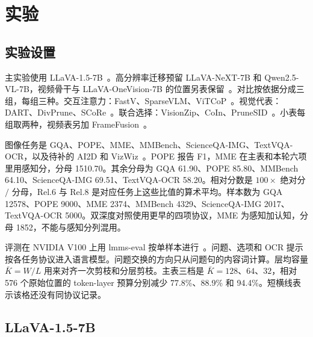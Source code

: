 \section{实验}
\label{sec:experiments}

\subsection{实验设置}
\label{sec:setup}

主实验使用 LLaVA-1.5-7B~\cite{llava15}。高分辨率迁移预留 LLaVA-NeXT-7B 和 Qwen2.5-VL-7B，视频骨干与 LLaVA-OneVision-7B 的位置另表保留~\cite{llavanext,qwen25vl,onevision}。对比按依据分成三组，每组三种。交互注意力：FastV、SparseVLM、ViTCoP~\cite{fastv,sparsevlm,vitcop}。视觉代表：DART、DivPrune、SCoRe~\cite{dart,divprune,score}。联合选择：VisionZip、CoIn、PruneSID~\cite{visionzip,coin,prunesid}。小表每组取两种，视频表另加 FrameFusion~\cite{framefusion}。

图像任务是 GQA、POPE、MME、MMBench、ScienceQA-IMG、TextVQA-OCR，以及待补的 AI2D 和 VizWiz~\cite{gqa,pope,mme,mmbench,scienceqa,textvqa,ai2d,vizwiz}。POPE 报告 F1，MME 在主表和本轮六项里用感知分，分母 1510.70。其余分母为 GQA 61.90、POPE 85.80、MMBench 64.10、ScienceQA-IMG 69.51、TextVQA-OCR 58.20。相对分数是 $100\times$ 绝对分 $/$ 分母，Rel.6 与 Rel.8 是对应任务上这些比值的算术平均。样本数为 GQA 12578、POPE 9000、MME 2374、MMBench 4329、ScienceQA-IMG 2017、TextVQA-OCR 5000。双深度对照使用更早的四项协议，MME 为感知加认知，分母 1852，不能与感知分列混用。

评测在 NVIDIA V100 上用 lmms-eval 按单样本进行~\cite{lmmseval}。问题、选项和 OCR 提示按各任务协议进入语言模型。问题交换的方向只从问题句的内容词计算。层均容量 $\bar K=W/L$ 用来对齐一次剪枝和分层剪枝。主表三档是 $\bar K=128$、$64$、$32$，相对 576 个原始位置的 token-layer 预算分别减少 77.8\%、88.9\% 和 94.4\%。短横线表示该格还没有同协议记录。

\subsection{LLaVA-1.5-7B}
\label{sec:main}

